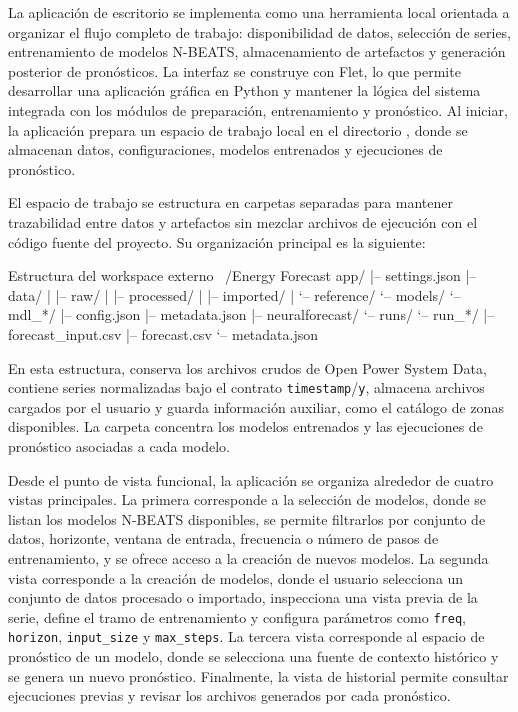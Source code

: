 La aplicación de escritorio se implementa como una herramienta local orientada a organizar el flujo completo de trabajo: disponibilidad de datos, selección de series, entrenamiento de modelos N-BEATS, almacenamiento de artefactos y generación posterior de pronósticos. La interfaz se construye con Flet, lo que permite desarrollar una aplicación gráfica en Python y mantener la lógica del sistema integrada con los módulos de preparación, entrenamiento y pronóstico. Al iniciar, la aplicación prepara un espacio de trabajo local en el directorio , donde se almacenan datos, configuraciones, modelos entrenados y ejecuciones de pronóstico.

El espacio de trabajo se estructura en carpetas separadas para mantener trazabilidad entre datos y artefactos sin mezclar archivos de ejecución con el código fuente del proyecto. Su organización principal es la siguiente:

\begin{codeblock}{Estructura del workspace externo}
    ~/Energy Forecast app/
    |-- settings.json
    |-- data/
    |   |-- raw/
    |   |-- processed/
    |   |-- imported/
    |   `-- reference/
    `-- models/
    `-- mdl_*/
    |-- config.json
    |-- metadata.json
    |-- neuralforecast/
    `-- runs/
    `-- run_*/
    |-- forecast_input.csv
    |-- forecast.csv
    `-- metadata.json
\end{codeblock}

En esta estructura,  conserva los archivos crudos de Open Power System Data,  contiene series normalizadas bajo el contrato \texttt{timestamp}/\texttt{y},  almacena archivos cargados por el usuario y  guarda información auxiliar, como el catálogo de zonas disponibles. La carpeta  concentra los modelos entrenados y las ejecuciones de pronóstico asociadas a cada modelo.

Desde el punto de vista funcional, la aplicación se organiza alrededor de cuatro vistas principales. La primera corresponde a la selección de modelos, donde se listan los modelos N-BEATS disponibles, se permite filtrarlos por conjunto de datos, horizonte, ventana de entrada, frecuencia o número de pasos de entrenamiento, y se ofrece acceso a la creación de nuevos modelos. La segunda vista corresponde a la creación de modelos, donde el usuario selecciona un conjunto de datos procesado o importado, inspecciona una vista previa de la serie, define el tramo de entrenamiento y configura parámetros como \texttt{freq}, \texttt{horizon}, \texttt{input\_size} y \texttt{max\_steps}. La tercera vista corresponde al espacio de pronóstico de un modelo, donde se selecciona una fuente de contexto histórico y se genera un nuevo pronóstico. Finalmente, la vista de historial permite consultar ejecuciones previas y revisar los archivos generados por cada pronóstico.


